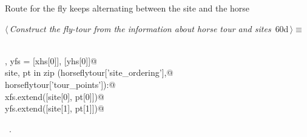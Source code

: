 \documentclass[11.5pt]{report}
\begin{document}
\vspace{-0.8cm} \newchunk Route for the fly  keeps alternating between the site and the horse
\begin{flushleft} \small
\begin{minipage}{\linewidth}\label{scrap85}\raggedright\small
{} $\langle\,${\itshape Construct the fly-tour from the information about horse tour and sites}\nobreak\ {\footnotesize {60d}}$\,\rangle\equiv$
\vspace{-1ex}
\begin{list}{}{} \item
\mbox{}\verb@@\\
\mbox{}\verb@xfs , yfs = [xhs[0]], [yhs[0]]@\\
\mbox{}\verb@for site, pt in zip (horseflytour['site_ordering'],@\\
\mbox{}\verb@                     horseflytour['tour_points']):@\\
\mbox{}\verb@   xfs.extend([site[0], pt[0]])@\\
\mbox{}\verb@   yfs.extend([site[1], pt[1]])@\\
\mbox{}\verb@@{\NWsep}
\end{list}
\vspace{-1.5ex}
\footnotesize
\begin{list}{}{\setlength{\itemsep}{-\parsep}\setlength{\itemindent}{-\leftmargin}}
\item \NWtxtMacroRefIn\ .

\item{}
\end{list}
\end{minipage}\vspace{4ex}
\end{flushleft}
\end{document}
